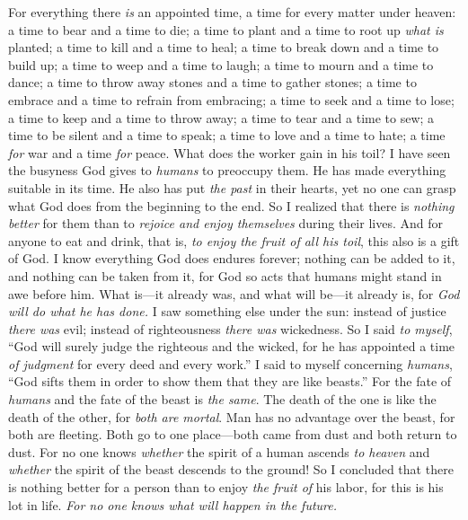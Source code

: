 \begin{biblechapter} %
 For everything there \textit{is} an appointed time, a time for every matter under heaven:
\verse a time to bear and a time to die; 
a time to plant and a time to root up \textit{what is} planted;
\verse a time to kill and a time to heal; 
a time to break down and a time to build up;
\verse a time to weep and a time to laugh; 
a time to mourn and a time to dance;
\verse a time to throw away stones and a time to gather stones; 
a time to embrace and a time to refrain from embracing;
\verse a time to seek and a time to lose; 
a time to keep and a time to throw away;
\verse a time to tear and a time to sew; 
a time to be silent and a time to speak;
\verse a time to love and a time to hate; 
a time \textit{for} war and a time \textit{for} peace.
\verse What does the worker gain in his toil?
 I have seen the busyness God gives to \textit{humans} to preoccupy them.
\verse He has made everything suitable in its time. He also has put \textit{the past} in their hearts, yet no one can grasp what God does from the beginning to the end.
\verse So I realized that there is \textit{nothing better} for them than to \textit{rejoice and enjoy themselves} during their lives.
\verse And for anyone to eat and drink, that is, \textit{to enjoy the fruit of all his toil}, this also is a gift of God.
\verse I know everything God does endures forever; 
nothing can be added to it, and nothing can be taken from it, 
for God so acts that humans might stand in awe before him.
\verse What is—it already was, 
and what will be—it already is, 
for \textit{God will do what he has done.}
 I saw something else under the sun: instead of justice \textit{there was} evil; instead of righteousness \textit{there was} wickedness.
\verse So I said \textit{to myself}, “God will surely judge the righteous and the wicked, for he has appointed a time \textit{of judgment} for every deed and every work.”
\verse I said to myself concerning \textit{humans}, “God sifts them in order to show them that they are like beasts.”
\verse For the fate of \textit{humans} and the fate of the beast is \textit{the same}. The death of the one is like the death of the other, for \textit{both are mortal}. Man has no advantage over the beast, for both are fleeting.
\verse Both go to one place—both came from dust and both return to dust.
\verse For no one knows \textit{whether} the spirit of a human ascends \textit{to heaven} and \textit{whether} the spirit of the beast descends to the ground!
\verse So I concluded that there is nothing better for a person than to enjoy \textit{the fruit of} his labor, for this is his lot in life. \textit{For no one knows what will happen in the future.}
\end{biblechapter}

